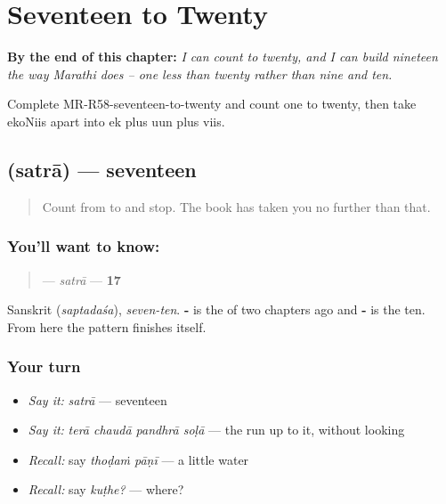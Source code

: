 
\chapter{Seventeen to Twenty}
\label{ch:mr-seventeen-to-twenty}

\begin{chapteropening}
\textbf{By the end of this chapter:} \emph{I can count to twenty, and I can build nineteen the way Marathi does -- one less than twenty rather than nine and ten.}

Complete MR-R58-seventeen-to-twenty and count one to twenty, then take ekoNiis apart into ek plus uun plus viis.
\end{chapteropening}

\section[\texorpdfstring{\mr{सतरा} (satrā)}{सतरा (satrā)}]{ (satrā) — seventeen}

\label{lesson:MR-C58-satra}



\begin{quote}
Count from \textbf{} to \textbf{} and stop. The book has taken you no further than that.
\end{quote}

\subsection*{You'll want to know: }
\begin{quote}
\textbf{} — \emph{satrā} — \textbf{17}
\end{quote}

Sanskrit \textbf{} (\emph{saptadaśa}), \emph{seven-ten}. \textbf{-} is the \textbf{} of two chapters ago and \textbf{-} is the ten. From here the pattern finishes itself.

\subsection*{Your turn}
\begin{itemize}
\raggedright
  \item \emph{Say it:} \emph{satrā} — seventeen
  \item \emph{Say it:} \emph{terā chaudā pandhrā soḷā} — the run up to it, without looking
  \item \emph{Recall:} say \emph{thoḍaṁ pāṇī} — a little water
  \item \emph{Recall:} say \emph{kuṭhe?} — where?
\end{itemize}

